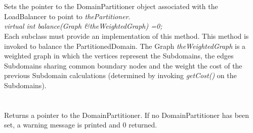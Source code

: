  \\
 \\
Sets the pointer to the DomainPartitioner object associated with the
LoadBalancer to point to {\em thePartitioner}. \\

{\em virtual int balance(Graph \&theWeightedGraph) =0;} \\ 
Each subclass must provide an implementation of this method. This
method is invoked to balance the PartitionedDomain. The Graph {\em
theWeightedGraph} is a weighted graph in which the vertices represent
the Subdomains, the edges Subdomains sharing common boundary nodes and
the weight the cost of the previous Subdomain calculations (determined
by invoking {\em getCost()} on the Subdomains). \\


  \\
\\
Returns a pointer to the DomainPartitioner. If no DomainPartitioner
has been set, a warning message is printed and $0$ returned. \\




